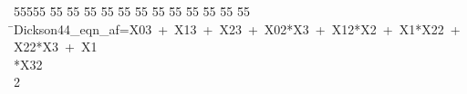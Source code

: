 %
%
\begin{tabbing}
55555 \= 55 \= 55 \= 55 \= 55 \= 55 \= 55 \= 55 \= 55 \= 55 \= 55 \= 55 \= 55 \= \>Dickson44\_eqn\_af=X03\ +\ X13\ +\ X23\ +\ X02*X3\ +\ X12*X2\ +\ X1*X22\ +\ X22*X3\ +\ X1\\[0pt]
\>*X32\\[0pt]
2\>\end{tabbing}
